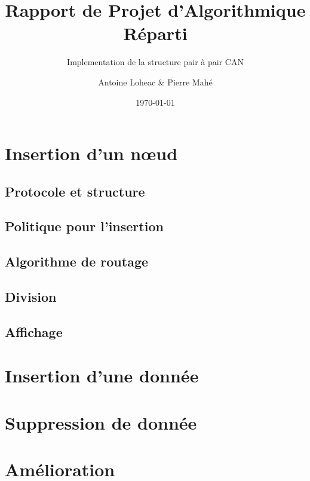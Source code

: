 \documentclass[a4paper, titlepage, oneside, 12pt]{article}%
\title{Rapport de Projet d'Algorithmique Réparti}
\subtitle{Implementation de la structure pair à pair CAN}
\author{Antoine Loheac \& Pierre Mahé}
\date{\today}
\begin{document}
 
\maketitle 
\tableofcontents

\newpage

\section{Insertion d'un nœud}

\subsection{Protocole et structure}
\subsection{Politique pour l'insertion}
\subsection{Algorithme de routage}
\subsection{Division}
\subsection{Affichage}

\section{Insertion d'une donnée}

\section{Suppression de donnée}

\section{Amélioration}
\end{document}
